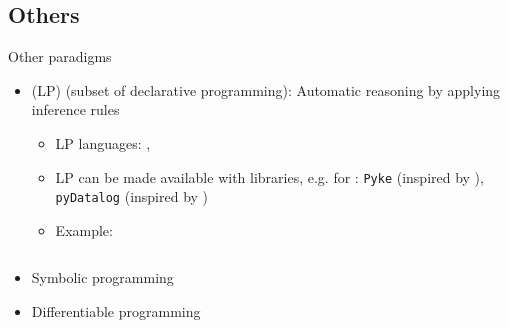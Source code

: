 \subsection{Others}




\begin{frame}{Other paradigms}
	\begin{itemize}
		\item {} (LP) (subset of declarative programming): Automatic reasoning by applying inference rules
		\begin{itemize}
			\item LP languages: , 
			\item LP can be made available with libraries, e.g. for : \texttt{Pyke} (inspired by ), \texttt{pyDatalog} (inspired by )
			\item Example:
			\inputminted[]{prolog}{code/paradigms/lp/siblings.pl}
		\end{itemize}
		\item Symbolic programming
		\item Differentiable programming
	\end{itemize}
\end{frame}
